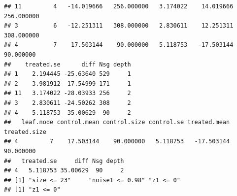 \documentclass[smallextended]{svjour3}
\makeatletter
\newenvironment{kframe}{%
 \def\at@end@of@kframe{}%
 \ifinner\ifhmode%
  \def\at@end@of@kframe{\end{minipage}}%
  \begin{minipage}{\columnwidth}%
 \fi\fi%
 \def\FrameCommand##1{\hskip\@totalleftmargin \hskip-\fboxsep
 \colorbox{shadecolor}{##1}\hskip-\fboxsep
     \hskip-\linewidth \hskip-\@totalleftmargin \hskip\columnwidth}%
 \MakeFramed {\advance\hsize-\width
   \@totalleftmargin\z@ \linewidth\hsize
   \@setminipage}}%
 {\par\unskip\endMakeFramed%
 \at@end@of@kframe}
\newenvironment{knitrout}{}{} %
\makeatother
\begin{document}
\begin{knitrout}
\begin{kframe}
\begin{verbatim}
## 11         4   -14.019666   256.000000   3.174022    14.019666   256.000000
## 3          6   -12.251311   308.000000   2.830611    12.251311   308.000000
## 4          7    17.503144    90.000000   5.118753   -17.503144    90.000000
##    treated.se      diff Nsg depth
## 1    2.194445 -25.63640 529     1
## 2    3.981912  17.54999 171     1
## 11   3.174022 -28.03933 256     2
## 3    2.830611 -24.50262 308     2
## 4    5.118753  35.00629  90     2
##   leaf.node control.mean control.size control.se treated.mean treated.size
## 4         7    17.503144    90.000000   5.118753   -17.503144    90.000000
##   treated.se     diff Nsg depth
## 4   5.118753 35.00629  90     2
## [1] "size <= 23"     "noise1 <= 0.98" "z1 <= 0"       
## [1] "z1 <= 0"
\end{verbatim}
\end{kframe}
\end{knitrout}
\end{document}
